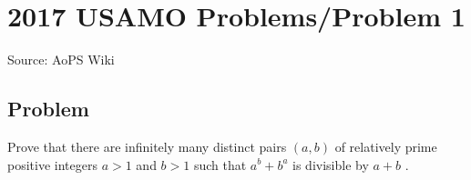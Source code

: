 \documentclass[12pt]{article}
\begin{document}
\section*{{2017 USAMO Problems/Problem 1}}
Source: AoPS Wiki

\subsection*{Problem}
Prove that there are infinitely many distinct pairs $(a,b)$ of relatively prime positive integers $a>1$ and $b>1$ such that $a^b+b^a$ is divisible by $a+b$ .
\end{document}
